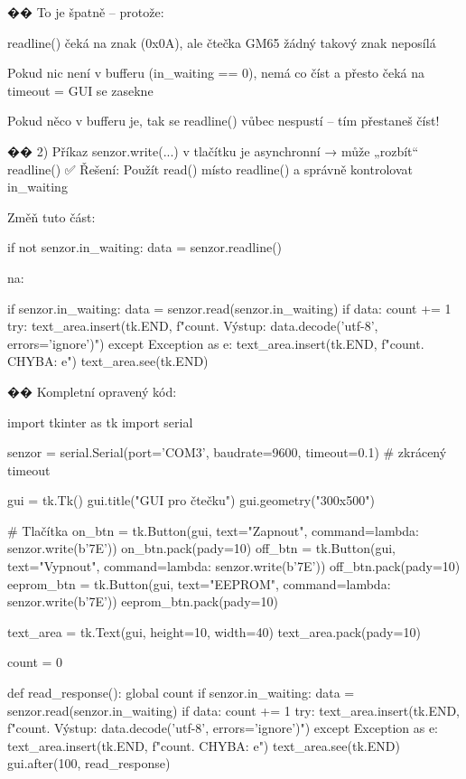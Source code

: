 �� To je špatně – protože:

    readline() čeká na znak \n (0x0A), ale čtečka GM65 žádný takový znak neposílá

    Pokud nic není v bufferu (in_waiting == 0), nemá co číst a přesto čeká na timeout = GUI se zasekne

    Pokud něco v bufferu je, tak se readline() vůbec nespustí – tím přestaneš číst!

�� 2) Příkaz senzor.write(...) v tlačítku je asynchronní → může „rozbít“ readline()
✅ Řešení: Použít read() místo readline() a správně kontrolovat in_waiting

Změň tuto část:

if not senzor.in_waiting:
    data = senzor.readline()

na:

if senzor.in_waiting:
    data = senzor.read(senzor.in_waiting)
    if data:
        count += 1
        try:
            text_area.insert(tk.END, f"{count}. Výstup: {data.decode('utf-8', errors='ignore')}\n")
        except Exception as e:
            text_area.insert(tk.END, f"{count}. CHYBA: {e}\n")
        text_area.see(tk.END)

�� Kompletní opravený kód:

import tkinter as tk
import serial

senzor = serial.Serial(port='COM3', baudrate=9600, timeout=0.1)  # zkrácený timeout

gui = tk.Tk()
gui.title("GUI pro čtečku")
gui.geometry("300x500")

# Tlačítka
on_btn = tk.Button(gui, text="Zapnout", command=lambda: senzor.write(b'\x7E\xEA\xAB\xCD'))
on_btn.pack(pady=10)
off_btn = tk.Button(gui, text="Vypnout", command=lambda: senzor.write(b'\x7E\xAB\xCD'))
off_btn.pack(pady=10)
eeprom_btn = tk.Button(gui, text="EEPROM", command=lambda: senzor.write(b'\x7E\xDE{}'))
eeprom_btn.pack(pady=10)

text_area = tk.Text(gui, height=10, width=40)
text_area.pack(pady=10)

count = 0

def read_response():
    global count
    if senzor.in_waiting:
        data = senzor.read(senzor.in_waiting)
        if data:
            count += 1
            try:
                text_area.insert(tk.END, f"{count}. Výstup: {data.decode('utf-8', errors='ignore')}\n")
            except Exception as e:
                text_area.insert(tk.END, f"{count}. CHYBA: {e}\n")
            text_area.see(tk.END)
    gui.after(100, read_response)

